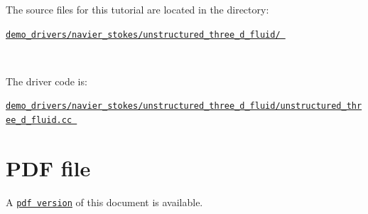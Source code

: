 \begin{DoxyItemize}
\item The source files for this tutorial are located in the directory\+:~\newline
~\newline
\begin{center} \href{../../../../demo_drivers/navier_stokes/unstructured_three_d_fluid/}{\tt demo\+\_\+drivers/navier\+\_\+stokes/unstructured\+\_\+three\+\_\+d\+\_\+fluid/ } \end{center} ~\newline

\item The driver code is\+: ~\newline
~\newline
\begin{center} \href{../../../../demo_drivers/navier_stokes/unstructured_three_d_fluid/unstructured_three_d_fluid.cc}{\tt demo\+\_\+drivers/navier\+\_\+stokes/unstructured\+\_\+three\+\_\+d\+\_\+fluid/unstructured\+\_\+three\+\_\+d\+\_\+fluid.\+cc } \end{center} 
\end{DoxyItemize}



 

 \hypertarget{index_pdf}{}\section{P\+D\+F file}\label{index_pdf}
A \href{../latex/refman.pdf}{\tt pdf version} of this document is available. 

